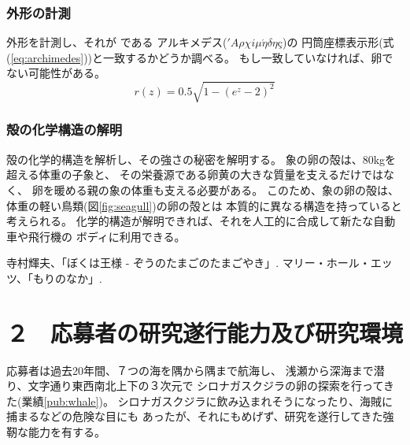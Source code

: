 \documentclass[11pt,a4j,dvipdfmx]{jarticle} 					%
\newcommand{\研究課題名}{象の卵}
\newcommand{\研究機関名}{逢坂大学}
\newcommand{\研究代表者氏名}{湯川秀樹}
\newcommand{\研究期間の最終元号年度}{11}  %
\begin{document}
\subsubsection{外形の計測}
        外形を計測し、それが
        である
        アルキメデス(\('A\rho\chi i\mu\acute{\eta}\delta\eta\mbox{\c{c}}\))の
        円筒座標表示形(式(\ref{eq:archimedes}))と一致するかどうか調べる。
        もし一致していなければ、卵でない可能性がある。
        \begin{equation}
        	\label{eq:archimedes}
        	r(z) = 0.5\sqrt{1-(e^z-2)^2}
        \end{equation}

\subsubsection{殻の化学構造の解明}
	殻の化学的構造を解析し、その強さの秘密を解明する。
	象の卵の殻は、80kgを超える体重の子象と、
	その栄養源である卵黄の大きな質量を支えるだけではなく、
	卵を暖める親の象の体重も支える必要がある。
	このため、象の卵の殻は、体重の軽い鳥類(図\ref{fig:seagull})の卵の殻とは
	本質的に異なる構造を持っていると考えられる。
	化学的構造が解明できれば、それを人工的に合成して新たな自動車や飛行機の
	ボディに利用できる。

\vspace*{1zw}
\begin{thebibliography}{99}
	 寺村輝夫、「ぼくは王様 - ぞうのたまごのたまごやき」.
	 マリー・ホール・エッツ、「もりのなか」.
\end{thebibliography}




\section{２　応募者の研究遂行能力及び研究環境}

\PapersInstructions		%
	応募者は過去20年間、７つの海を隅から隅まで航海し、
	浅瀬から深海まで潜り、文字通り東西南北上下の３次元で
	シロナガスクジラの卵の探索を行ってきた(業績\ref{pub:whale})。		%
	シロナガスクジラに飲み込まれそうになったり、海賊に捕まるなどの危険な目にも
	あったが、それにもめげず、研究を遂行してきた強靭な能力を有する。
\end{document}
